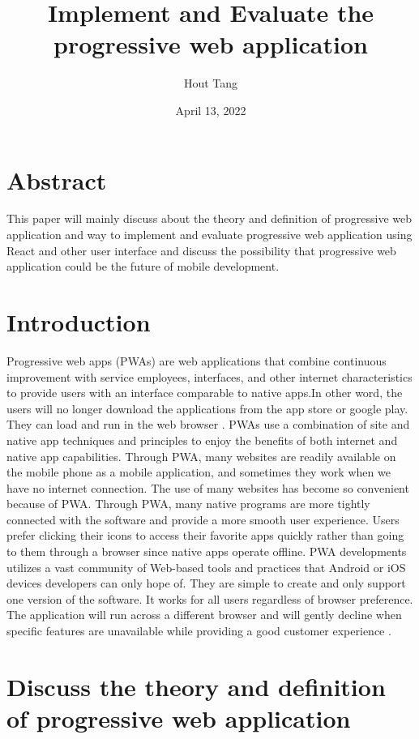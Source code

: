 \documentclass{article}
\title{Implement and Evaluate the progressive web application}
\author{Hout Tang}
\date{April 13, 2022}
\begin{document}
\maketitle

\section*{Abstract}
This paper will mainly discuss about the theory and definition of progressive web application and way to implement and evaluate progressive web application using React and other user interface and discuss the possibility that progressive web application could be the future of mobile development.


\section*{Introduction}
 
 Progressive web apps (PWAs) are web applications that combine continuous improvement with service employees, interfaces, and other internet characteristics to provide users with an interface comparable to native apps.In other word, the users will no longer download the applications from the app store or google play. They can load and run in the web browser  \cite{rbArticle}. PWAs use a combination of site and native app techniques and principles to enjoy the benefits of both internet and native app capabilities. Through PWA, many websites are readily available on the mobile phone as a mobile application, and sometimes they work when we have no internet connection. The use of many websites has become so convenient because of PWA. Through PWA, many native programs are more tightly connected with the software and provide a more smooth user experience. Users prefer clicking their icons to access their favorite apps quickly rather than going to them through a browser since native apps operate offline. PWA developments utilizes a vast community of Web-based tools and practices that Android or iOS devices developers can only hope of. They are simple to create and only support one version of the software. It works for all users regardless of browser preference. The application will run across a different browser and will gently decline when specific features are unavailable while providing a good customer experience \cite{7283028}.
 
\section*{Discuss the theory and definition of progressive web application}
\end{document}
